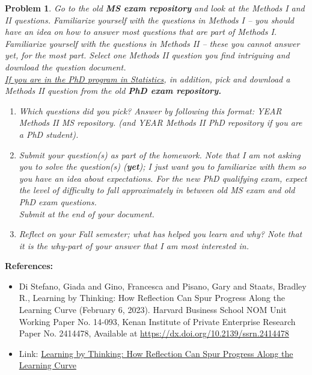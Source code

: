 \documentclass[11pt]{exam}
\newtheorem{problem}{Problem}
\newcommand{\1}{\boldsymbol{1}}
\newcommand{\0}{\boldsymbol{0}}
\begin{document}
\newpage
\begin{problem}  Go to the old \textbf{MS exam repository} and look at the Methods I and II questions. Familiarize yourself with the questions in Methods I -- you should have an idea on how to answer most questions that are part of Methods I. Familiarize yourself with the questions in Methods II -- these you cannot answer yet, for the most part. Select one Methods II question you find intriguing and download the question document. \\
    
    \underline{If you are in the PhD program in Statistics}, in addition, pick and download a Methods II question from the old \textbf{PhD exam repository.}
    
 \begin{enumerate}   
    
\item[a)] Which questions did you pick? Answer by following this format: YEAR Methods II MS repository. (and YEAR Methods II PhD repository if you are a PhD student). \\[2cm]

\item[b)] Submit your question(s) as part of the homework. Note that I am not asking you to solve the question(s) (\textbf{yet}); I just want you to familiarize with them so you have an idea about expectations. For the new PhD qualifying exam, expect the level of difficulty to fall approximately in between old MS exam and old PhD exam questions. \\

Submit at the end of your document.
\item[c)] Reflect on your Fall semester; what has helped you learn and why? Note that it is the \textit{why-part} of your answer that I am most interested in. 
\end{enumerate}
\end{problem}
\vfill

\textbf{References:}


\begin{itemize}
\item Di Stefano, Giada and Gino, Francesca and Pisano, Gary and Staats, Bradley R., Learning by Thinking: How Reflection Can Spur Progress Along the Learning Curve (February 6, 2023). Harvard Business School NOM Unit Working Paper No. 14-093, Kenan Institute of Private Enterprise Research Paper No. 2414478, Available at \href{https://dx.doi.org/10.2139/ssrn.2414478}{https://dx.doi.org/10.2139/ssrn.2414478}
\item Link: \href{https://papers.ssrn.com/sol3/papers.cfm?abstract_id=2414478}{Learning by Thinking: How Reflection Can Spur Progress Along the Learning Curve}
\end{itemize}
\end{document}
